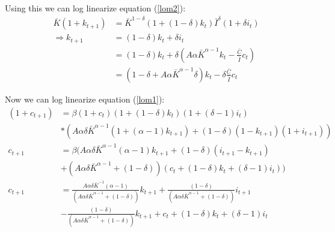 \documentclass[11pt]{article} %
\begin{document}
Using this we can log linearize equation (\ref{lom2}):
\begin{align*}
\bar{K}(1+k_{t+1}) &= \bar{K}^{1-\delta}(1+(1-\delta)k_t)\bar{I}^{\delta}(1+\delta i_t)\\
\Rightarrow k_{t+1} &= (1-\delta)k_t + \delta i_t\\
&= (1-\delta)k_t + \delta \left( A\alpha\bar{K}^{\alpha - 1}k_t - \frac{\bar{C}}{\bar{I}}c_t \right)\\
&= (1-\delta + A\alpha\bar{K}^{\alpha - 1}\delta) k_t - \delta\frac{\bar{C}}{\bar{I}}c_t
\end{align*}

Now we can log linearize equation (\ref{lom1}):
\begin{align*}
(1+c_{t+1}) &= \beta (1+c_{t}) (1+(1-\delta)k_t) (1+(\delta - 1)i_t)\\ &*(A\alpha \delta \bar{K}^{\alpha - 1}(1+(\alpha -1)k_{t+1}) + (1-\delta)(1-k_{t+1})(1+i_{t+1}))\\
c_{t+1} &= \beta (A\alpha\delta\bar{K}^{\alpha-1}(\alpha - 1)k_{t+1} + (1-\delta)(i_{t+1} - k_{t+1})\\ &+ (A\alpha\delta\bar{K}^{\alpha-1} + (1-\delta))(c_t + (1-\delta)k_t + (\delta - 1)i_t))\\
c_{t+1} &= \frac{A\alpha \delta \bar{K}^{-1}(\alpha -1)}{(A\alpha\delta\bar{K}^{\alpha-1} + (1-\delta))}k_{t+1} +  \frac{ (1-\delta)}{(A\alpha\delta\bar{K}^{\alpha-1} + (1-\delta))} i_{t+1} \\
&-   \frac{ (1-\delta)}{(A\alpha\delta\bar{K}^{\alpha-1} + (1-\delta))} k_{t+1} + c_t + (1-\delta)k_t + (\delta - 1)i_t
\end{align*}
\end{document}

